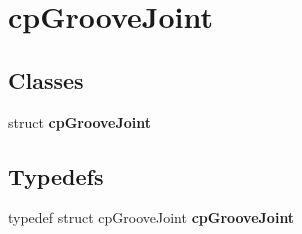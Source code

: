 \hypertarget{group__cp_groove_joint}{\section{cp\-Groove\-Joint}
\label{group__cp_groove_joint}
}
\subsection*{Classes}
\begin{DoxyCompactItemize}
\item 
struct {\bfseries cp\-Groove\-Joint}
\end{DoxyCompactItemize}
\subsection*{Typedefs}
\begin{DoxyCompactItemize}
\item 
\hypertarget{group__cp_groove_joint_ga3156d22efbaa9f0d67f3e53d9d2dbec1}{typedef struct cp\-Groove\-Joint {\bfseries cp\-Groove\-Joint}}\label{group__cp_groove_joint_ga3156d22efbaa9f0d67f3e53d9d2dbec1}

\end{DoxyCompactItemize}
